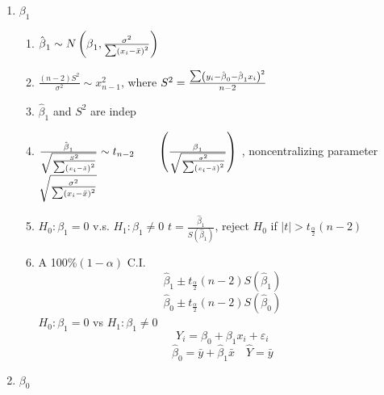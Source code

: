 \documentclass{article}
\begin{document}
\begin{enumerate}
\item $\beta _{1}$

\begin{enumerate}
\item $\hat{\beta}_{1}\sim N\left( \beta _{1},\frac{\sigma ^{2}}{\tsum
\left( x_{i}-\bar{x}\right) ^{2}}\right) $

\item $\frac{\left( n-2\right) S^{2}}{\sigma ^{2}}\sim x_{n-1}^{2}$, where $%
S^{2}=\frac{\tsum \left( y_{i}-\hat{\beta}_{0}-\hat{\beta}_{1}x_{i}\right)
^{2}}{n-2}$

\item $\hat{\beta}_{1}$ and $S^{2}$ are indep

\item $\frac{\hat{\beta}_{1}}{\sqrt{\frac{S^{2}}{\tsum \left( x_{i}-\bar{x}%
\right) ^{2}}}}\sim t_{n-2}\qquad \left( \frac{\beta _{1}}{\sqrt{\frac{%
\sigma ^{2}}{\tsum \left( x_{i}-\bar{x}\right) ^{2}}}}\right) $ ,
noncentralizing parameter $\sqrt{\frac{\sigma ^{2}}{\tsum \left( x_{i}-\bar{x%
}\right) ^{2}}}$

\item $H_{0}:\beta _{1}=0$ v.s. $H_{1}:\beta _{1}\neq 0$\newline
$t=\frac{\hat{\beta}_{1}}{S\left( \hat{\beta}_{1}\right) }$, reject $H_{0}$
if $\left\vert t\right\vert >t_{\frac{\alpha }{2}}\left( n-2\right) $

\item A 100\%$\left( 1-\alpha \right) $ C.I.%
\begin{equation*}
\hat{\beta}_{1}\pm t_{\frac{\alpha }{2}}\left( n-2\right) S\left( \hat{\beta}%
_{1}\right) 
\end{equation*}%
\begin{equation*}
\hat{\beta}_{0}\pm t_{\frac{\alpha }{2}}\left( n-2\right) S\left( \hat{\beta}%
_{0}\right) 
\end{equation*}%
\newline
$H_{0}:\beta _{1}=0$ vs $H_{1}:\beta _{1}\neq 0$%
\begin{equation*}
Y_{i}=\beta _{0}+\beta _{1}x_{i}+\varepsilon _{i}
\end{equation*}%
\begin{equation*}
\hat{\beta}_{0}=\bar{y}+\hat{\beta}_{1}\bar{x}\quad \hat{Y}=\bar{y}
\end{equation*}
\end{enumerate}

\item $\beta _{0}$


\end{enumerate}
\end{document}
